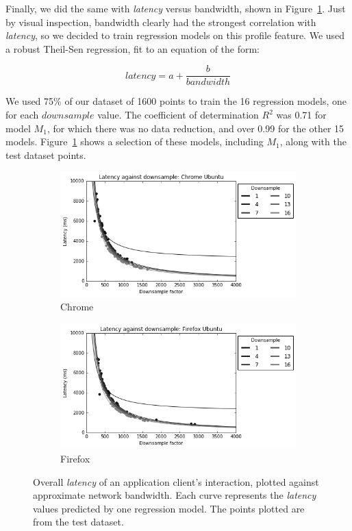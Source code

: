 Finally, we did the same with \emph{latency} versus bandwidth, shown in
Figure~\ref{fig:bandwidth}. Just by visual inspection, bandwidth clearly had
the strongest correlation with \emph{latency}, so we decided to train
regression models on this profile feature. We used a robust Theil-Sen
regression, fit to an equation of the form:

\begin{equation*}
  latency = a + \frac{b}{bandwidth}
\end{equation*}

We used 75\% of our dataset of 1600 points to train the 16 regression models,
one for each $downsample$ value. The coefficient of determination $R^2$ was
0.71 for model $M_1$, for which there was no data reduction, and over 0.99 for
the other 15 models. Figure~\ref{fig:bandwidth} shows a selection of these
models, including $M_1$, along with the test dataset points.\\

  \begin{figure}[h]
  \begin{center}
  \begin{subfigure}{0.49\textwidth}
    \includegraphics[width=\textwidth]{./img/chrome-bandwidth.png}
    \caption{Chrome}
  \end{subfigure}
  \begin{subfigure}{0.49\textwidth}
    \includegraphics[width=\textwidth]{./img/firefox-bandwidth.png}
    \caption{Firefox}
  \end{subfigure}
  \caption{Overall \emph{latency} of an application client's interaction,
      plotted against approximate network bandwidth. Each curve represents the
      \emph{latency} values predicted by one regression model. The points
      plotted are from the test dataset.}
    \label{fig:bandwidth}
  \end{center}
  \end{figure}

